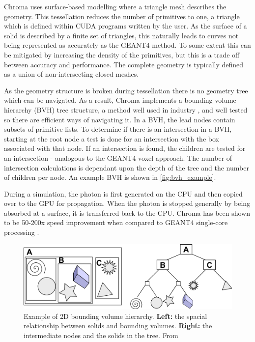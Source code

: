 Chroma uses surface-based modelling where a triangle mesh describes the geometry.
This tessellation reduces the number of primitives to one, a triangle which is defined within CUDA programs written by the user.
As the surface of a solid is described by a finite set of triangles, this naturally leads to curves not being represented as accurately as the GEANT4 method.
To some extent this can be mitigated by increasing the density of the primitives, but this is a trade off between accuracy and performance.
The complete geometry is typically defined as a union of non-intersecting closed meshes.
\par
As the geometry structure is broken during tessellation there is no geometry tree which can be navigated.
As a result, Chroma implements a bounding volume hierarchy (BVH) tree structure, a method well used in industry \cite{real_time_collision_detection_ref}, and well tested so there are efficient ways of navigating it.
In a BVH, the lead nodes contain subsets of primitive lists.
To determine if there is an intersection in a BVH, starting at the root node a test is done for an intersection with the box associated with that node.
If an intersection is found, the children are tested for an intersection - analogous to the GEANT4 voxel approach.
The number of intersection calculations is dependant upon the depth of the tree and the number of children per node.
An example BVH is shown in \autoref{fig:bvh_example}.
\par
During a simulation, the photon is first generated on the CPU and then copied over to the GPU for propagation.
When the photon is stopped generally by being absorbed at a surface, it is transferred back to the CPU.
Chroma has been shown to be 50-200x speed improvement when compared to GEANT4 single-core processing \cite{chroma_whitepaper_ref,chroma_presentation_ref}.
\begin{figure}
    \centering
    \includegraphics[width=\textwidth]{Figures/Simulations/bounding_volume_hierarchy.png}
    \caption{Example of 2D bounding volume hierarchy. 
             \textbf{Left:} the spacial relationship between solids and bounding volumes.
             \textbf{Right:} the intermediate nodes and the solids in the tree.
             From \cite{bounding_box_ref}}
    \label{fig:bvh_example}
\end{figure}
